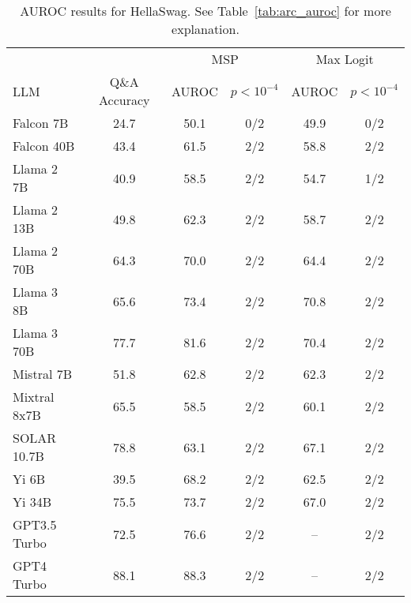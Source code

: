 \begin{table*}[h]
\centering
\caption{AUROC results for HellaSwag. See Table~\ref{tab:arc_auroc} for more explanation.}
\label{tab:hellaswag_auroc}
\begin{tabular}{lccccc}
\toprule
& & \multicolumn{2}{c}{MSP} & \multicolumn{2}{c}{Max Logit} \\ 
LLM & Q\&A Accuracy & AUROC & $p < 10^{-4}$ & AUROC & $p < 10^{-4}$ \\ 
\cmidrule(lr){1-1} \cmidrule(lr){2-2} \cmidrule(lr){3-4} \cmidrule(lr){5-6} 
Falcon 7B & 24.7 & 50.1 & 0/2 & 49.9 & 0/2\\
Falcon 40B & 43.4 & 61.5 & 2/2 & 58.8 & 2/2\\
Llama 2 7B & 40.9 & 58.5 & 2/2 & 54.7 & 1/2\\
Llama 2 13B & 49.8 & 62.3 & 2/2 & 58.7 & 2/2\\
Llama 2 70B & 64.3 & 70.0 & 2/2 & 64.4 & 2/2\\
Llama 3 8B & 65.6 & 73.4 & 2/2 & 70.8 & 2/2\\
Llama 3 70B & 77.7 & 81.6 & 2/2 & 70.4 & 2/2\\
Mistral 7B & 51.8 & 62.8 & 2/2 & 62.3 & 2/2\\
Mixtral 8x7B & 65.5 & 58.5 & 2/2 & 60.1 & 2/2\\
SOLAR 10.7B & 78.8 & 63.1 & 2/2 & 67.1 & 2/2\\
Yi 6B & 39.5 & 68.2 & 2/2 & 62.5 & 2/2\\
Yi 34B & 75.5 & 73.7 & 2/2 & 67.0 & 2/2\\
GPT3.5 Turbo & 72.5 & 76.6 & 2/2 & -- & 2/2\\
GPT4 Turbo & 88.1 & 88.3 & 2/2 & -- & 2/2\\
\bottomrule
\end{tabular}
\end{table*}
